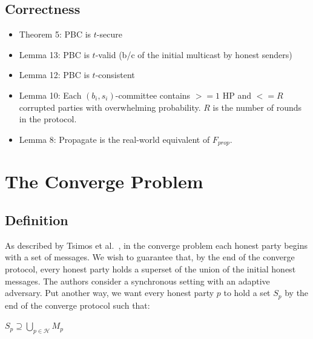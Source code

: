 \documentclass{article}
\begin{document}
\subsection{Correctness}
\begin{itemize}
\item Theorem 5: PBC is $t$-secure
\item Lemma 13: PBC is $t$-valid (b/c of the initial multicast by honest senders)
\item Lemma 12: PBC is $t$-consistent
\item Lemma 10: Each $(b_i, s_i)$-committee contains $>= 1$ HP and $<= R$ corrupted parties with overwhelming probability. $R$ is the number of rounds in the protocol.
\item Lemma 8: Propagate is the real-world equivalent of $F_{prop}$.
\end{itemize}



\section{The Converge Problem}
\subsection{Definition}
As described by Tsimos et al.~\cite{PBC}, in the converge problem each honest party begins with a set of messages. We wish to guarantee that, by the end of the converge protocol, every honest party holds a superset of the union of the initial honest messages. The authors consider a synchronous setting with an adaptive adversary. Put another way, we want every honest party $p$ to hold a set $S_p$ by the end of the converge protocol such that:
\begin{center}
    $S_p \supseteq \bigcup\limits_{p \in \mathcal H} M_p$ 
\end{center}
\end{document}
